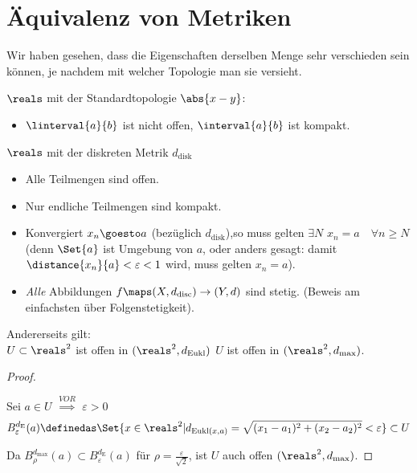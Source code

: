 \section*{Äquivalenz von Metriken}
Wir haben gesehen, dass die Eigenschaften derselben Menge sehr verschieden sein können, je nachdem mit welcher Topologie man sie versieht.
\begin{beispiel*}
    \( \reals \) mit der Standardtopologie \( \abs{x-y} \):
    \begin{itemize}
        \item \( \linterval{a}{b} \) ist nicht offen, \( \interval{a}{b} \) ist kompakt.
    \end{itemize}
    \( \reals \) mit der diskreten Metrik \( d_{\text{disk}} \)
    \begin{itemize}
        \item Alle Teilmengen sind offen.
        \item Nur endliche Teilmengen sind kompakt.
        \item Konvergiert \( x_n\goesto a \) (bezüglich \( d_{\text{disk}} \)),so muss gelten \( \exists N \) \sd \( x_n=a\quad \forall n\geq N \) (denn \( \Set{a} \) ist Umgebung von \( a \), oder anders gesagt: damit \( \distance{x_n}{a}<\varepsilon<1 \) wird, muss gelten \( x_n=a \)).
        \item \emph{Alle} Abbildungen \( f\maps (X,d_{\text{disc}})\to (Y,d) \) sind stetig. (Beweis am einfachsten über Folgenstetigkeit).
    \end{itemize}
    Andererseits gilt:\\
    \( U\subset \reals^2 \) ist offen in \( (\reals^2,d_{\text{Eukl}}) \) \tiff \( U \) ist offen in \( (\reals^2, d_{\max}) \).
    \begin{proof}
        \begin{proofdescription}
            \item[\hin] Sei \( a\in U \) \( \overset{VOR}{\implies} \) \texists \( \varepsilon>0 \) \sd
            \begin{align*}
                B_{\varepsilon}^{d_\text{E}}(a)\definedas \Set{x\in \reals^2|d_{\text{Eukl}(x,a)}=\sqrt{(x_1-a_1)^2+(x_2-a_2)^2}<\varepsilon}\subset U
            \end{align*} 
        \end{proofdescription}
        Da \( B_{\rho}^{d_{\max}}(a)\subset B_{\varepsilon}^{d_{\text{E}}}(a) \) für \( \rho=\frac{\varepsilon}{\sqrt{2}} \), ist \( U \) auch offen \( (\reals^2, d_{\max}) \).

\end{proof}
\end{beispiel*}
